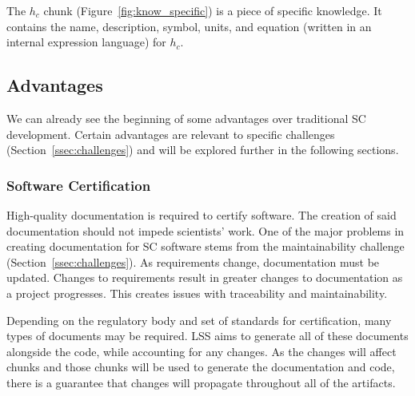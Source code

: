 \documentclass{sig-alternate-05-2015}
\newcommand{\lss}{LSS}
\begin{document}
The $h_c$ chunk (Figure~\ref{fig:know_specific}) is a piece of specific
knowledge. It contains the name, description, symbol, units, and equation
(written in an internal expression language) for $h_c$.

\subsection{Advantages} \label{ssec:advantages}

We can already see the beginning of some advantages over traditional SC
development. Certain advantages are relevant to specific challenges (Section~\ref{ssec:challenges}) and will be
explored further in the following sections.

\subsubsection{Software Certification} \label{sssec:adv_cert}

High-quality documentation is required to certify software. 
The creation of said documentation should not impede scientists' work. One of
the major problems in creating documentation for SC software stems from the
maintainability challenge (Section~\ref{ssec:challenges}). As requirements
change, documentation must be updated. Changes to requirements result in
greater changes to documentation as a project progresses. This creates issues
with traceability and maintainability.

Depending on the regulatory body and set of standards for certification, many
types of documents may be required. \lss{} aims to generate all of these
documents alongside the code, while accounting for any changes. As the
changes will affect chunks and those chunks will be used to generate the
documentation and code, there is a guarantee that changes will propagate
throughout all of the artifacts.
\end{document}
